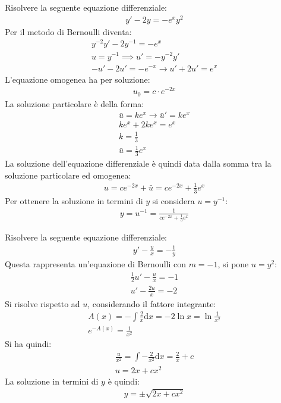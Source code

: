 \documentclass{article}
\newcommand{\df}{\mathrm{d}}
\numberwithin{equation}{subsection}
\begin{document}
Risolvere la seguente equazione differenziale:
\begin{gather*}
    y'-2y=-e^xy^2
\end{gather*}
Per il metodo di Bernoulli diventa:
\begin{gather*}
    y^{-2}y'-2y^{-1}=-e^{x}\\
    u=y^{-1}\implies u'=-y^{-2}y'\\
    -u'-2u'=-e^{-x}\to u'+2u'=e^{x}
\end{gather*}
L'equazione omogenea ha per soluzione:
\begin{gather*}
    u_0=c\cdot e^{-2x}
\end{gather*}
La soluzione particolare è della forma:
\begin{gather*}
    \bar{u}=ke^{x}\to\bar{u}'=ke^x\\
    ke^x+2ke^{x}=e^x\\
    k=\displaystyle\frac{1}{3}\\
    \bar{u}=\displaystyle\frac{1}{3}e^{x}
\end{gather*}
La soluzione dell'equazione differenziale è quindi data dalla somma tra la soluzione particolare ed omogenea:
\begin{gather*}
    u=c e^{-2x}+\bar{u}=c e^{-2 x}+\displaystyle\frac{1}{3}e^{x}
\end{gather*}
Per ottenere la soluzione in termini di $y$ si considera $u=y^{-1}$:
\begin{gather*}
    y=u^{-1}=\displaystyle\frac{1}{c e^{-2x}+\frac{1}{3}e^{x}}
\end{gather*}


Risolvere la seguente equazione differenziale:
\begin{gather*}
    y'-\displaystyle\frac{y}{x}=-\frac{1}{y}
\end{gather*}
Questa rappresenta un'equazione di Bernoulli con $m=-1$, si pone $u=y^2$:
\begin{gather*}
    \frac{1}{2}u'-\frac{u}{x}=-1\\
    u'-\frac{2u}{x}=-2
\end{gather*}
Si risolve rispetto ad $u$, considerando il fattore integrante:
\begin{gather*}
    A(x)=-\displaystyle\int\frac{2}{x}\df x=-2\ln x=\ln\frac{1}{x^2}\\
    e^{-A(x)}=\frac{1}{x^2}
\end{gather*}
Si ha quindi:
\begin{gather*}
    \frac{u}{x^2}=\int-\frac{2}{x^2}\df x=\frac{2}{x}+c\\
    u=2x+cx^2
\end{gather*}
La soluzione in termini di $y$ è quindi:
\begin{gather*}
    y=\pm\sqrt{2x+cx^2}
\end{gather*}
\end{document}
